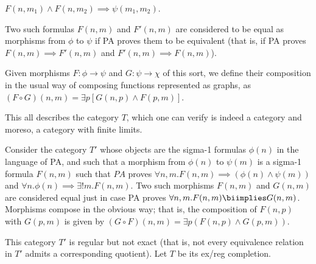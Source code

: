 \begin{construction}
$F(n, m_1) \wedge F(n, m_2) \implies \psi(m_1, m_2)$.

Two such formulas $F(n, m)$ and $F'(n, m)$ are considered to be equal as morphisms from $\phi$ to $\psi$ if PA proves them to be equivalent (that is, if PA proves $F(n, m) \implies F'(n, m)$ and $F'(n, m) \implies F(n, m)$).

Given morphisms $F : \phi \to \psi$ and $G: \psi \to \chi$ of this sort, we define their composition in the usual way of composing functions represented as graphs, as $(F \circ G)(n, m) = \exists p [G(n, p) \wedge F(p, m)]$.

This all describes the category $T$, which one can verify is indeed a category and moreso, a category with finite limits.


Consider the category $T'$ whose objects are the sigma-1 formulas $\phi(n)$ in the language of PA, and such that a morphism from $\phi(n)$ to $\psi(m)$ is a sigma-1 formula $F(n, m)$ such that $PA$ proves $\forall n, m . F(n, m) \implies (\phi(n) \wedge \psi(m))$ and $\forall n . \phi(n) \implies \exists! m . F(n, m)$. Two such morphisms $F(n, m)$ and $G(n, m)$ are considered equal just in case PA proves $\forall n, m . F(n, m) \biimplies G(n, m)$. Morphisms compose in the obvious way; that is, the composition of $F(n, p)$ with $G(p, m)$ is given by $(G \circ F)(n, m) = \exists p (F(n, p) \wedge G(p, m))$.

This category $T'$ is regular but not exact (that is, not every equivalence relation in $T'$ admits a corresponding quotient). Let $T$ be its ex/reg completion.

\end{construction}


